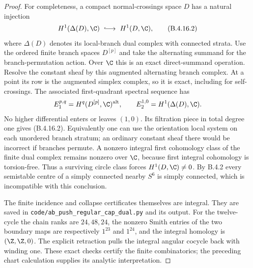 \begin{proof}
For completeness, a compact normal-crossings space $D$
has a natural injection
\[
 H^1(\Delta(D),\C)\ \lhook\joinrel\longrightarrow\
 H^1(D,\C),
 \tag{B.4.16.2}
\]
where $\Delta(D)$ denotes its local-branch dual
complex with connected strata. Use the ordered finite
branch spaces $D^{[p]}$ and take the alternating
summand for the branch-permutation action. Over $\C$
this is an exact direct-summand operation. Resolve the
constant sheaf by this augmented alternating branch
complex. At a point its row is the augmented simplex
complex, so it is exact, including for self-crossings.
The associated first-quadrant spectral sequence has
\[
 E_1^{p,q}=H^q(D^{[p]},\C)^{\mathrm{alt}},
 \qquad
 E_2^{1,0}=H^1(\Delta(D),\C).
\]
No higher differential enters or leaves $(1,0)$.
Its filtration piece in total degree one gives
(B.4.16.2). Equivalently one can use the orientation
local system on each unordered branch stratum; an
ordinary constant sheaf there would be incorrect if
branches permute. A nonzero integral first cohomology
class of the finite dual complex remains nonzero over
$\C$, because first integral cohomology is torsion-free.
Thus a surviving circle class forces $H^1(D,\C)\ne0$.
By B.4.2 every semistable centre of
a simply connected nearby $S^6$ is simply connected,
which is incompatible with this conclusion.

The finite incidence and collapse certificates themselves
are integral. They are
saved in \texttt{code/ab\_push\_regular\_cap\_dual.py}
and its output. For the twelve-cycle the chain ranks
are $24,48,24$, the nonzero Smith entries of the two
boundary maps are respectively $1^{23}$ and $1^{24}$,
and the integral homology is $(\Z,\Z,0)$.
The explicit retraction pulls the integral angular
cocycle back with winding one. These exact checks
certify the finite combinatorics; the preceding chart
calculation supplies its analytic interpretation.
\end{proof}

